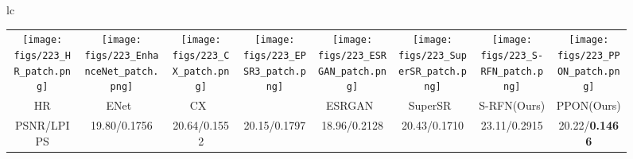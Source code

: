 \documentclass[preprint]{elsarticle}
\begin{document}
\begin{figure*}[htpb]
{\begin{tabular}{lc}
\begin{adjustbox}{valign=t}
\begin{tabular}{cccccccc}
					\texttt{[image: figs/223\_HR\_patch.png]} &
					\hspace{-3mm}
					\texttt{[image: figs/223\_EnhanceNet\_patch.png]} &
					\hspace{-3mm}
					\texttt{[image: figs/223\_CX\_patch.png]} &
					\hspace{-3mm}
					\texttt{[image: figs/223\_EPSR3\_patch.png]} &
					\hspace{-3mm}
					\texttt{[image: figs/223\_ESRGAN\_patch.png]} &
					\hspace{-3mm}
					\texttt{[image: figs/223\_SuperSR\_patch.png]} &
					\hspace{-3mm}
					\texttt{[image: figs/223\_S-RFN\_patch.png]} &
					\hspace{-3mm}
					\texttt{[image: figs/223\_PPON\_patch.png]} \\
					HR & \hspace{-3mm} ENet~\cite{EnhanceNet} & \hspace{-3mm} CX~\cite{CX} & \hspace{-3mm} ~\cite{EPSR} & \hspace{-3mm} ESRGAN~\cite{ESRGAN} & \hspace{-3mm} SuperSR~\cite{ESRGAN} & \hspace{-3mm} S-RFN(Ours) & \hspace{-3mm} PPON(Ours) \\
					PSNR/LPIPS & \hspace{-3mm} 19.80/0.1756 & \hspace{-3mm} 20.64/0.1552 & \hspace{-3mm} 20.15/0.1797 & \hspace{-3mm} 18.96/0.2128 & \hspace{-3mm} 20.43/0.1710 & \hspace{-3mm} 23.11/0.2915 & \hspace{-3mm} 20.22/\textbf{0.1466} \\
				\end{tabular}
			\end{adjustbox}
			\\
			\begin{adjustbox}{valign=t}
				\scriptsize
				\begin{tabular}{c}

\end{tabular}
\end{adjustbox}
\end{tabular}}
\end{figure*}
\end{document}
